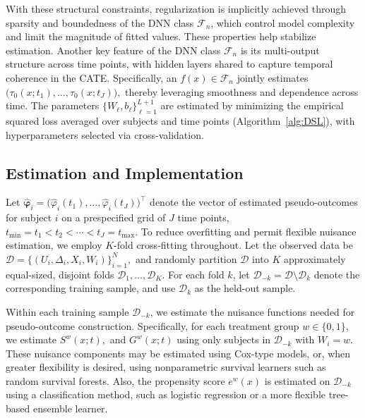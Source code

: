 \documentclass{article}
\begin{document}
{ With these structural constraints, regularization is implicitly achieved through sparsity and boundedness of the DNN class $\mathcal{F}_n$, which control model complexity and limit the magnitude of fitted values. These properties help stabilize estimation. } Another key feature of the DNN class $\mathcal{F}_n$ is its multi-output structure across time points, with hidden layers shared to capture temporal coherence in the CATE. Specifically, an $f(x) \in \mathcal{F}_n$ jointly estimates
\(
\big(\tau_0(x;t_1),\ldots,\tau_0(x;t_J)\big),
\)
thereby leveraging smoothness and dependence across time. The parameters $\{W_\ell, b_\ell\}_{\ell=1}^{L+1}$ are estimated by minimizing the empirical squared loss averaged over subjects and time points (Algorithm~\ref{alg:DSL}), with hyperparameters selected via cross-validation.

\subsection{Estimation and Implementation}
\label{est_and_implement}

Let
\(
\hat{\boldsymbol{\varphi}}_i
=
\bigl(\hat{\varphi}_i(t_1),\ldots,\hat{\varphi}_i(t_J)\bigr)^\top
\)
denote the vector of estimated pseudo-outcomes for subject \(i\)
on a prespecified grid of \(J\) time points,
\(
t_{\min}=t_1 < t_2 < \cdots < t_J=t_{\max}.
\)
 To reduce overfitting and permit flexible nuisance estimation, we employ
\(K\)-fold cross-fitting throughout. Let the observed data be
\(
\mathcal D=\{(U_i,\Delta_i,X_i,W_i)\}_{i=1}^N,
\)
 and  randomly partition \(\mathcal D\) into \(K\) approximately equal-sized, disjoint folds
\(
\mathcal D_1,\ldots,\mathcal D_K.
\) For each fold \(k\), let \(\mathcal D_{-k}=\mathcal D\setminus \mathcal D_k\) denote the corresponding training sample, and use \(\mathcal D_k\) as the held-out sample. 

{Within each training sample \(\mathcal D_{-k}\), we estimate the nuisance functions needed for pseudo-outcome construction. Specifically, for each treatment group \(w\in\{0,1\}\), we estimate 
\(
S^w(x;t),
\) and 
\(
G^w(x;t)
\)  using only subjects in \(\mathcal D_{-k}\) with \(W_i=w\). 
These nuisance components may be estimated using Cox-type models, or, when greater flexibility is desired, using nonparametric survival learners such as random survival forests. Also, the propensity score
\(
e^w(x) 
\)
is estimated on \(\mathcal D_{-k}\) using a classification method, such as logistic regression or a more flexible tree-based ensemble learner. } 
\end{document}
